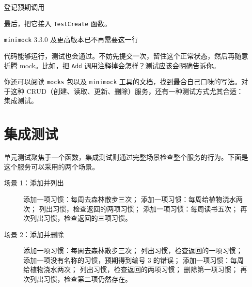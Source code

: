 \begin{codeannotations}
\item 登记预期调用
\end{codeannotations}

最后，把它接入 \texttt{TestCreate} 函数。


\begin{codeannotations}
\item \texttt{minimock} 3.3.0 及更高版本已不再需要这一行
\end{codeannotations}

代码能够运行，测试也会通过。不妨先提交一次，留住这个正常状态，然后再随意折腾 mock。比如，把 \texttt{Add} 调用注释掉会怎样？测试应该会明确告诉你。

你还可以阅读 \texttt{mocks} 包以及 \texttt{minimock} 工具的文档，找到最合自己口味的写法。对于这种 CRUD（创建、读取、更新、删除）服务，还有一种测试方式尤其合适：集成测试。

\section{集成测试}

单元测试聚焦于一个函数，集成测试则通过完整场景检查整个服务的行为。下面是这个服务可以采用的两个场景。

\begin{description}
  \item[场景 1：添加并列出]
  添加一项习惯：每周去森林散步三次；
  添加一项习惯：每周给植物浇水两次；
  列出习惯，检查返回的两项习惯；
  添加一项习惯：每周读书五次；
  再次列出习惯，检查返回的三项习惯。

  \item[场景 2：添加并删除]
  添加一项习惯：每周去森林散步三次；
  列出习惯，检查返回的一项习惯；
  添加一项没有名称的习惯，预期得到编号 3 的错误；
  添加一项习惯：每周给植物浇水两次；
  列出习惯，检查返回的两项习惯；
  删除第一项习惯；
  再次列出习惯，检查第二项仍然存在。
\end{description}

